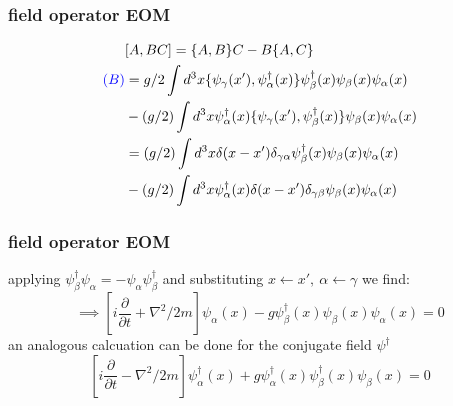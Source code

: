 \documentclass{beamer}
\begin{document}

\begin{frame}
\frametitle{field operator EOM}
\begin{eqnarray*}
&[A,BC] = \{A,B\}C - B\{A,C\} \\
\color{blue} (B) \color{black} & = g/2 \int d^3 x \{\psi_{\gamma}(x'),\psi_{\alpha}^{\dagger}(x)\}\psi_{\beta}^{\dagger}(x)\psi_{\beta}(x)\psi_{\alpha}(x)\\
& - (g/2)\int d^3 x \psi_{\alpha}^{\dagger}(x)\{\psi_{\gamma}(x'),\psi_{\beta}^{\dagger}(x) \}\psi_{\beta}(x)\psi_{\alpha}(x) \\
& = (g/2)\int d^3 x \delta(x-x')\delta_{\gamma\alpha}\psi_{\beta}^{\dagger}(x)\psi_{\beta}(x)\psi_{\alpha}(x)\\
& - (g/2)\int d^3x \psi_{\alpha}^{\dagger}(x)\delta(x-x')\delta_{\gamma\beta}\psi_{\beta}(x)\psi_{\alpha}(x) 
\end{eqnarray*}

\end{frame}

\begin{frame}
\frametitle{field operator EOM}
applying $\psi_{\beta}^{\dagger}\psi_{\alpha} = -\psi_{\alpha}\psi_{\beta}^{\dagger}$ and substituting $x\leftarrow x', \ \alpha \leftarrow \gamma$ we find:
\begin{equation*}
\implies \left[i\frac{\partial}{\partial t} + \nabla^2 / 2m\right]\psi_{\alpha}(x) - g\psi_{\beta}^{\dagger}(x)\psi_{\beta}(x)\psi_{\alpha}(x) = 0
\end{equation*}
an analogous calcuation can be done for the conjugate field $\psi^{\dagger}$
\begin{equation*}
\left[i\frac{\partial}{\partial t} - \nabla^2 / 2m\right]\psi_{\alpha}^{\dagger}(x) + g\psi_{\alpha}^{\dagger}(x)\psi_{\beta}^{\dagger}(x)\psi_{\beta}(x) = 0
\end{equation*}
\end{frame}
\end{document}
